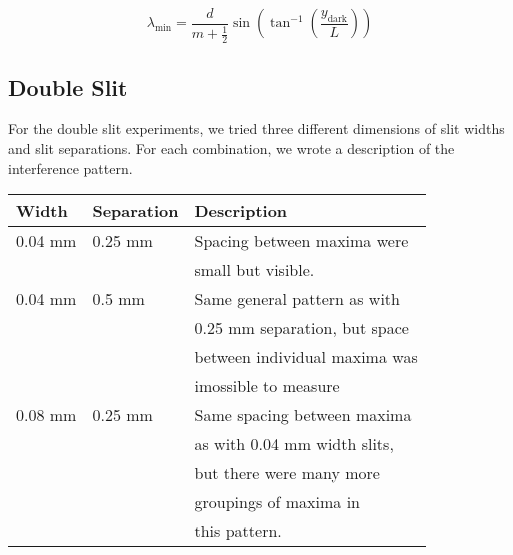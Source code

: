 \documentclass[12pt]{article}
\begin{document}
\begin{center}
  \begin{equation*}
    \lambda_{\mathrm{min}} = \frac{d}{m+\frac{1}{2}} \sin \left( \tan^{-1} \left( \frac{y_{\mathrm{dark}}}{L} \right) \right)
  \end{equation*}
\end{center}

\subsection*{Double Slit}
For the double slit experiments, we tried three different dimensions
of slit widths and slit separations. For each combination, we wrote a
description of the interference pattern.

\begin{center}
  \begin{tabular}{|l|l|l|}
    \hline
    Width & Separation & Description \\
    \hline
    0.04 mm & 0.25 mm & Spacing between maxima were \\ & &small but visible. \\
    0.04 mm & 0.5 mm & Same general pattern as with \\ & &0.25 mm separation, but space\\ & &between individual maxima was\\ & &imossible to measure \\
    0.08 mm & 0.25 mm & Same spacing between maxima \\ & &as with 0.04 mm width slits,\\ & &but there were many more\\ & &groupings of maxima in\\ & &this pattern. \\
    \hline
  \end{tabular}
\end{center}
\end{document}
